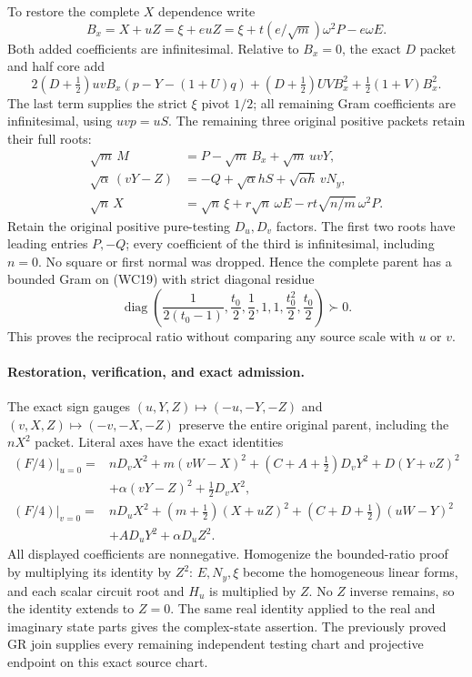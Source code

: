To restore the complete $X$ dependence write
\[
 B_x=X+uZ=\xi+euZ
 =\xi+t(e/\sqrt m)\omega^2P-e\omega E.              \tag{WC24}
\]
Both added coefficients are infinitesimal. Relative to $B_x=0$,
the exact $D$ packet and half core add
\[
 2(D+\tfrac12)uvB_x(p-Y-(1+U)q)
 +(D+\tfrac12)UVB_x^2+\tfrac12(1+V)B_x^2.           \tag{WC25}
\]
The last term supplies the strict $\xi$ pivot $1/2$; all remaining
Gram coefficients are infinitesimal, using $uvp=uS$.
The remaining three original positive packets retain their full roots:
\[
\begin{aligned}
 \sqrt m\,M&=P-\sqrt m\,B_x+\sqrt m\,uvY,\\
 \sqrt\alpha\,(vY-Z)&=-Q+\sqrt\alpha hS
                                      +\sqrt{\alpha h}\,vN_y,\\
 \sqrt n\,X&=\sqrt n\,\xi+r\sqrt n\,\omega E
                                  -rt\sqrt{n/m}\,\omega^2P.
\end{aligned}                                                    \tag{WC26}
\]
Retain the original positive pure-testing $D_u,D_v$ factors.
The first two roots have leading entries $P,-Q$; every coefficient
of the third is infinitesimal, including $n=0$. No square or
first normal was dropped. Hence the complete parent has a bounded
Gram on (WC19) with strict diagonal residue
\[
 \operatorname{diag}\left(\frac1{2(t_0-1)},\frac{t_0}2,
      \frac12,1,1,\frac{t_0^2}2,\frac{t_0}2\right)\succ0.
                                                               \tag{WC27}
\]
This proves the reciprocal ratio without comparing any source scale
with $u$ or $v$.

\paragraph{Restoration, verification, and exact admission.}
The exact sign gauges $(u,Y,Z)\mapsto(-u,-Y,-Z)$ and
$(v,X,Z)\mapsto(-v,-X,-Z)$ preserve the entire original parent,
including the $nX^2$ packet. Literal axes have the exact identities
\[
\begin{aligned}
 (F/4)|_{u=0}={}&nD_vX^2+m(vW-X)^2
 +(C+A+\tfrac12)D_vY^2+D(Y+vZ)^2\\
 &+\alpha(vY-Z)^2+\tfrac12D_vX^2,\\
 (F/4)|_{v=0}={}&nD_uX^2+(m+\tfrac12)(X+uZ)^2
 +(C+D+\tfrac12)(uW-Y)^2\\
 &+AD_uY^2+\alpha D_uZ^2.
\end{aligned}                                                    \tag{WC28}
\]
All displayed coefficients are nonnegative. Homogenize the
bounded-ratio proof by multiplying its
identity by $Z^2$: $E,N_y,\xi$ become the homogeneous linear
forms, and each scalar circuit root and $H_u$ is multiplied by $Z$.
No $Z$ inverse remains, so the identity extends to $Z=0$.
The same real identity applied to the real and imaginary state parts
gives the complex-state assertion. The previously proved GR join
supplies every remaining independent testing chart and projective
endpoint on this exact source chart.

